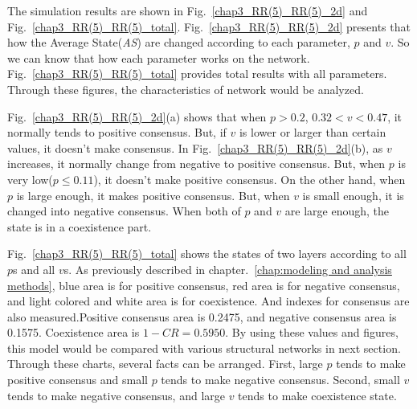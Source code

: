 The simulation results are shown in Fig.~\ref{chap3_RR(5)_RR(5)_2d} and Fig.~\ref{chap3_RR(5)_RR(5)_total}.  Fig.~\ref{chap3_RR(5)_RR(5)_2d} presents that how the Average State(\textit{AS}) are changed according to each parameter, $p$ and $v$. So we can know that how each parameter works on the network. Fig.~\ref{chap3_RR(5)_RR(5)_total} provides total results with all parameters. Through these figures, the characteristics of network would be analyzed.

Fig.~\ref{chap3_RR(5)_RR(5)_2d}(a) shows that when $p > 0.2$, $0.32 < v < 0.47$, it normally tends to positive consensus. But, if $v$ is lower or larger than certain values, it doesn't make consensus.
In Fig.~\ref{chap3_RR(5)_RR(5)_2d}(b), as $v$ increases, it normally change from negative to positive consensus. But, when $p$ is very low($p \le 0.11$), it doesn't make positive consensus. On the other hand, when $p$ is large enough, it makes positive consensus. But, when $v$ is small enough, it is changed into negative consensus. When both of $p$ and $v$ are large enough, the state is in a coexistence part.

Fig.~\ref{chap3_RR(5)_RR(5)_total} shows the states of two layers according to all $p$s and all $v$s. As previously described in chapter.~\ref{chap:modeling and analysis methods}, blue area is for positive consensus, red area is for negative consensus, and light colored and white area is for coexistence. And indexes for consensus are also measured.Positive consensus area is 0.2475, and negative consensus area is 0.1575. Coexistence area is $1 - CR = 0.5950$. By using these values and figures, this model would be compared with various structural networks in next section. Through these charts, several facts can be arranged. First, large $p$ tends to make positive consensus and small $p$ tends to make negative consensus. Second, small $v$ tends to make negative consensus, and large $v$ tends to make coexistence state. 


